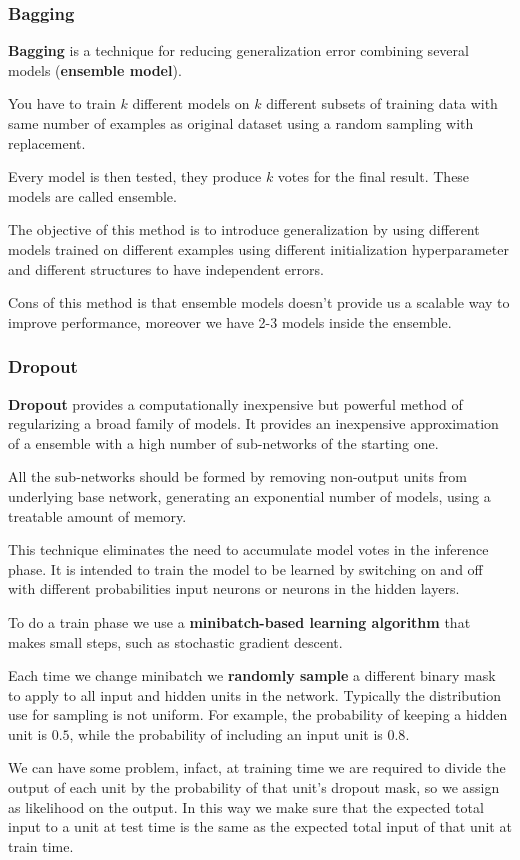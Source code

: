\subsubsection{Bagging}
\textbf{Bagging} is a technique for reducing generalization error combining
several models (\textbf{ensemble model}).

You have to train $k$ different models on $k$ different subsets of training data
with same number of examples as original dataset using a random sampling with
replacement.

Every model is then tested, they produce $k$ votes for the final result. These
models are called ensemble.

The objective of this method is to introduce generalization by using different
models trained on different examples using different initialization hyperparameter
and different structures to have independent errors.

Cons of this method is that ensemble models doesn't provide us a scalable way to
improve performance, moreover we have 2-3 models inside the ensemble.
\subsubsection{Dropout}
\textbf{Dropout} provides a computationally inexpensive but powerful method of
regularizing a broad family of models. It provides an inexpensive approximation
of a ensemble with a high number of sub-networks of the starting one.

All the sub-networks should be formed by removing non-output units from underlying
base network, generating an exponential number of models, using a treatable
amount of memory.

This technique eliminates the need to accumulate model votes in the inference
phase. It is intended to train the model to be learned by switching on and off
with different probabilities input neurons or neurons in the hidden layers.

To do a train phase we use a \textbf{minibatch-based learning algorithm} that
makes small steps, such as stochastic gradient descent.

Each time we change minibatch we \textbf{randomly sample} a different binary mask
to apply to all input and hidden units in the network. Typically the distribution
use for sampling is not uniform. For example, the probability of keeping a hidden
unit is $0.5$, while the probability of including an input unit is $0.8$.

We can have some problem, infact, at training time we are required to divide the
output of each unit by the probability of that unit's dropout mask, so we assign
as likelihood on the output. In this way we make sure that the expected total
input to a unit at test time is the same as the expected total input of that unit
at train time.

